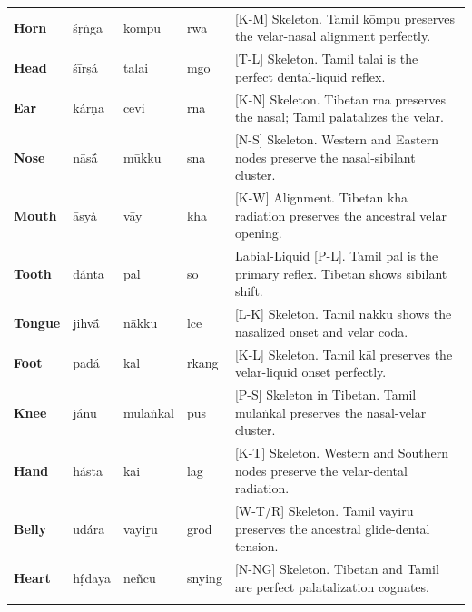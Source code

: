 \documentclass[11pt,oneside,openany]{book}
\begin{document}
\begin{longtable}{p{} p{} p{} p{} p{}}
\textbf{Horn} & śṛṅga & kompu & rwa & \small [K-M] Skeleton. Tamil kōmpu preserves the velar-nasal alignment perfectly. \\ 
\addlinespace[10pt]

\textbf{Head} & śīrṣá & talai & mgo & \small [T-L] Skeleton. Tamil talai is the perfect dental-liquid reflex. \\ 
\addlinespace[10pt]

\textbf{Ear} & kárṇa & cevi & rna & \small [K-N] Skeleton. Tibetan rna preserves the nasal; Tamil palatalizes the velar. \\ 
\addlinespace[10pt]

\textbf{Nose} & nāsā́ & mūkku & sna & \small [N-S] Skeleton. Western and Eastern nodes preserve the nasal-sibilant cluster. \\ 
\addlinespace[10pt]

\textbf{Mouth} & āsyà & vāy & kha & \small [K-W] Alignment. Tibetan kha radiation preserves the ancestral velar opening. \\ 
\addlinespace[10pt]

\textbf{Tooth} & dánta & pal & so & \small Labial-Liquid [P-L]. Tamil pal is the primary reflex. Tibetan shows sibilant shift. \\ 
\addlinespace[10pt]

\textbf{Tongue} & jihvā́ & nākku & lce & \small [L-K] Skeleton. Tamil nākku shows the nasalized onset and velar coda. \\ 
\addlinespace[10pt]

\textbf{Foot} & pādá & kāl & rkang & \small [K-L] Skeleton. Tamil kāl preserves the velar-liquid onset perfectly. \\ 
\addlinespace[10pt]

\textbf{Knee} & jā́nu & muḻaṅkāl & pus & \small [P-S] Skeleton in Tibetan. Tamil muḻaṅkāl preserves the nasal-velar cluster. \\ 
\addlinespace[10pt]

\textbf{Hand} & hásta & kai & lag & \small [K-T] Skeleton. Western and Southern nodes preserve the velar-dental radiation. \\ 
\addlinespace[10pt]

\textbf{Belly} & udára & vayiṟu & grod & \small [W-T/R] Skeleton. Tamil vayiṟu preserves the ancestral glide-dental tension. \\ 
\addlinespace[10pt]

\textbf{Heart} & hṛ́daya & neñcu & snying & \small [N-NG] Skeleton. Tibetan and Tamil are perfect palatalization cognates. \\ 
\addlinespace[10pt]


\end{longtable}
\end{document}
